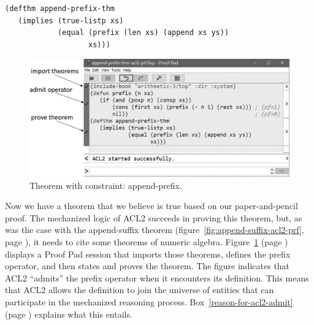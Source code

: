 \begin{code}
\begin{verbatim}
(defthm append-prefix-thm
   (implies (true-listp xs)
            (equal (prefix (len xs) (append xs ys))
                   xs)))
\end{verbatim}
\end{code}

\begin{figure}
\begin{center}
\includegraphics[scale=1]{images-cmyk/append-prefix-thm-acl2-prf-bw}
\end{center}
\caption{Theorem with constraint: append-prefix.}
\label{fig:append-prefix-acl2-prf}
\end{figure}

Now we have a theorem that we believe is true
based on our paper-and-pencil proof.
The mechanized logic of ACL2
succeeds in proving this theorem, but, as was the case with
the append-suffix theorem
(figure~\ref{fig:append-suffix-acl2-prf}, page \pageref{fig:append-suffix-acl2-prf}),
it needs to cite some theorems of numeric algebra.
Figure~\ref{fig:append-prefix-acl2-prf} (page \pageref{fig:append-prefix-acl2-prf})
displays a Proof Pad session that imports those theorems,
defines the prefix operator, and then states and proves the theorem.
The figure indicates that ACL2
``admits''
the prefix operator when it encounters its definition.
This means that ACL2 allows the definition to join
the universe of entities that can participate in
the mechanized reasoning process.
Box~\ref{reason-for-acl2-admit} (page \pageref{reason-for-acl2-admit})
explains what this entails.

